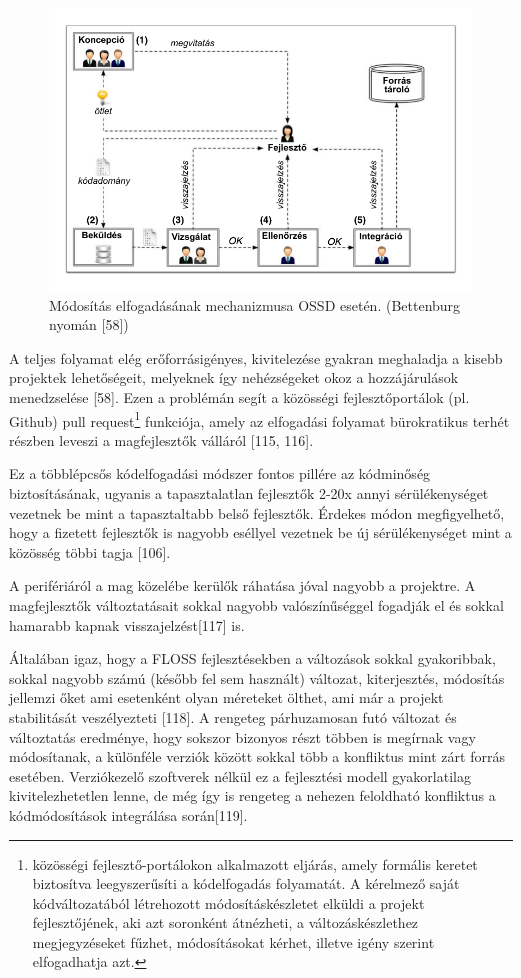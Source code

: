 \documentclass[12pt,magyar,a4paper,oneside]{scrreprt}
\begin{document}
\begin{figure}
\centering
\includegraphics{ábrák/hozzájárulás-módja-bettenburg_management_2015.pdf}
\caption{Módosítás elfogadásának mechanizmusa OSSD esetén. (Bettenburg
nyomán {[}58{]})}
\end{figure}

A teljes folyamat elég erőforrásigényes, kivitelezése gyakran meghaladja
a kisebb projektek lehetőségeit, melyeknek így nehézségeket okoz a
hozzájárulások menedzselése {[}58{]}. Ezen a problémán segít a közösségi
fejlesztőportálok (pl. Github) pull request\footnote{közösségi
  fejlesztő-portálokon alkalmazott eljárás, amely formális keretet
  biztosítva leegyszerűsíti a kódelfogadás folyamatát. A kérelmező saját
  kódváltozatából létrehozott módosításkészletet elküldi a projekt
  fejlesztőjének, aki azt soronként átnézheti, a változáskészlethez
  megjegyzéseket fűzhet, módosításokat kérhet, illetve igény szerint
  elfogadhatja azt.} funkciója, amely az elfogadási folyamat
bürokratikus terhét részben leveszi a magfejlesztők válláról {[}115,
116{]}.

Ez a többlépcsős kódelfogadási módszer fontos pillére az kódminőség
biztosításának, ugyanis a tapasztalatlan fejlesztők 2-20x annyi
sérülékenységet vezetnek be mint a tapasztaltabb belső fejlesztők.
Érdekes módon megfigyelhető, hogy a fizetett fejlesztők is nagyobb
eséllyel vezetnek be új sérülékenységet mint a közösség többi tagja
{[}106{]}.

A perifériáról a mag közelébe kerülők ráhatása jóval nagyobb a
projektre. A magfejlesztők változtatásait sokkal nagyobb valószínűséggel
fogadják el és sokkal hamarabb kapnak visszajelzést{[}117{]} is.

Általában igaz, hogy a FLOSS fejlesztésekben a változások sokkal
gyakoribbak, sokkal nagyobb számú (később fel sem használt) változat,
kiterjesztés, módosítás jellemzi őket ami esetenként olyan méreteket
ölthet, ami már a projekt stabilitását veszélyezteti {[}118{]}. A
rengeteg párhuzamosan futó változat és változtatás eredménye, hogy
sokszor bizonyos részt többen is megírnak vagy módosítanak, a különféle
verziók között sokkal több a konfliktus mint zárt forrás esetében.
Verziókezelő szoftverek nélkül ez a fejlesztési modell gyakorlatilag
kivitelezhetetlen lenne, de még így is rengeteg a nehezen feloldható
konfliktus a kódmódosítások integrálása során{[}119{]}.
\end{document}
